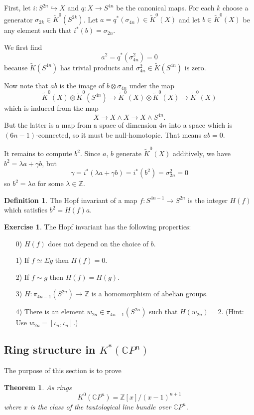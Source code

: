 \documentclass[a4paper,10pt]{article}
\theoremstyle{plain}%
\newtheorem{thm}{Theorem}
\theoremstyle{definition}
\newtheorem{defn}{Definition}
\newtheorem{exer}{Exercise}
\theoremstyle{remark}
\newcommand{\ZZ}{\mathbb{Z}}
\newcommand{\CC}{\mathbb{C}}
\newcommand{\KR}{\widetilde{K}}   %
\newcommand{\cp}{\CC P}   %
\newcommand{\smsh}{\wedge}  %
\newcommand{\susp}{\Sigma}  %
\newcommand{\htpyequiv}{\simeq}  %
\newcommand{\htpic}{\sim}  %
\begin{document}
First, let $i:S^{2n}\hookrightarrow X$ and $q:X\to S^{4n}$ be the canonical maps. For each $k$ choose a generator $\sigma_{2k}\in \KR^0(S^{2k})$. Let $a=q^*(\sigma_{4n})\in\KR^0(X)$ and let $b\in\KR^0(X)$ be any element such that $i^*(b)=\sigma_{2n}$.

We first find
$$a^2=q^*(\sigma_{4n}^2)=0$$
because $\KR(S^{4n})$ has trivial products and $\sigma_{4n}^2\in \KR(S^{4n})$ is zero.

Now note that $ab$ is the image of $b\otimes \sigma_{4n}$ under the map
$$\KR^0(X)\otimes \KR^0(S^{4n})\to \KR^0(X)\otimes \KR^0(X) \to \KR^0(X)$$
which is induced from the map
$$X\to X\smsh X\to X\smsh S^{4n}.$$
But the latter is a map from a space of dimension $4n$ into a space which is $(6n-1)$-connected, so it must be null-homotopic. That means $ab=0$.

It remains to compute $b^2$. Since $a$, $b$ generate $\KR^0(X)$ additively, we have $b^2=\lambda a+\gamma b$, but
$$\gamma=i^*(\lambda a+\gamma b)=i^*(b^2)=\sigma_{2n}^2=0$$
so $b^2=\lambda a$ for some $\lambda\in\ZZ$.

\begin{defn}
The Hopf invariant of a map $f:S^{4n-1}\to S^{2n}$ is the integer $H(f)$ which satisfies $b^2=H(f)a$.
\end{defn}



\begin{exer}
The Hopf invariant has the following properties:
\begin{itemize}
\item[0)] $H(f)$ does not depend on the choice of $b$.
\item[1)] If $f\htpyequiv \susp g$ then $H(f)=0$.
\item[2)] If $f\htpic g$ then $H(f)=H(g)$.
\item[3)] $H:\pi_{4n-1}(S^{2n})\to \ZZ$ is a homomorphism of abelian groups.
\item[4)] There is an element $w_{2n}\in \pi_{4n-1}(S^{2n})$ such that $H(w_{2n})=2$. (Hint: Use $w_{2n}=[\iota_n,\iota_n]$.)
\end{itemize}
\end{exer}


\subsection{Ring structure in $K^*(\cp^n)$}

The purpose of this section is to prove

\begin{thm}
As rings
$$
K^0(\cp^n)=\ZZ[x]/(x-1)^{n+1}
$$
where $x$ is the class of the tautological line bundle over $\cp^n$.
\end{thm}
\end{document}
